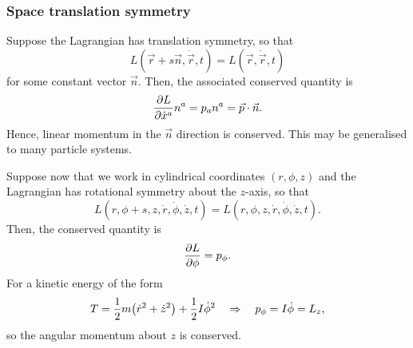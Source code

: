 \documentclass{article}
\begin{document}
\subsubsection{Space translation symmetry}
Suppose the Lagrangian has translation symmetry, so that
\begin{equation}
	L(\vec{r}+s\vec{n}, \dot{\vec{r}}, t) = L(\vec{r}, \dot{\vec{r}}, t)
\end{equation}
for some constant vector $ \vec{n} $. Then, the associated conserved quantity is
\begin{equation}
	\pdv{L}{\dot{x}^{a}} n^{a} = p_{a} n^{a} = \vec{p} \cdot \vec{n}.
\end{equation}
Hence, linear momentum in the $ \vec{n} $ direction is conserved. This may be generalised to many particle systems.
\par
Suppose now that we work in cylindrical coordinates $ (r, \phi, z) $ and the Lagrangian has rotational symmetry about the $ z $-axis, so that
\begin{equation}
	L(r, \phi+ s, z, \dot{r}, \dot{\phi}, \dot{z}, t) = L(r, \phi, z, \dot{r}, \dot{\phi}, \dot{z}, t).
\end{equation}
Then, the conserved quantity is
\begin{equation}
	\pdv{L}{\phi} = p_{\phi}.
\end{equation}
For a kinetic energy of the form
\[
	T = \frac{1}{2} m \qty(\dot{r}^{2} + \dot{z}^{2}) + \frac{1}{2} I \dot{\phi}^{2} \quad \Rightarrow \quad p_{\phi} = I \dot{\phi} = L_z,
\]
so the angular momentum about $ z $ is conserved.
\end{document}
